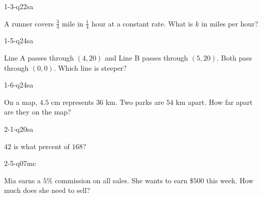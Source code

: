 
\begin{practiceQuestion}{1-3-q22}{sa}
\begin{questionText}
A runner covers $\frac{3}{4}$ mile in $\frac{1}{4}$ hour at a constant rate. What is $k$ in miles per hour?
\end{questionText}
\end{practiceQuestion}

\begin{practiceQuestion}{1-5-q24}{sa}
\begin{questionText}
Line A passes through $(4, 20)$ and Line B passes through $(5, 20)$. Both pass through $(0, 0)$. Which line is steeper?
\end{questionText}
\end{practiceQuestion}

\begin{practiceQuestion}{1-6-q24}{sa}
\begin{questionText}
On a map, $4.5$ cm represents $36$ km. Two parks are $54$ km apart. How far apart are they on the map?
\end{questionText}
\end{practiceQuestion}

\begin{practiceQuestion}{2-1-q20}{sa}
\begin{questionText}
$42$ is what percent of $168$?
\end{questionText}
\end{practiceQuestion}

\begin{practiceQuestion}{2-5-q07}{mc}
\begin{questionText}
Mia earns a $5\%$ commission on all sales. She wants to earn $\$500$ this week. How much does she need to sell?
\end{questionText}
\end{practiceQuestion}

